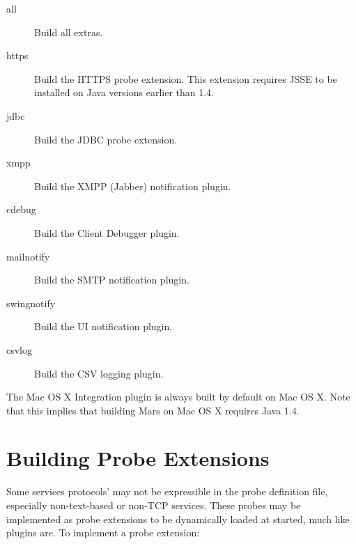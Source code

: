 \documentclass{article}
\begin{document}
\begin{description}
\item[all] Build all extras.
\item[https] Build the HTTPS probe extension. This extension requires
  JSSE to be installed on Java versions earlier than 1.4.
\item[jdbc] Build the JDBC probe extension.
\item[xmpp] Build the XMPP (Jabber) notification plugin.
\item[cdebug] Build the Client Debugger plugin.
\item[mailnotify] Build the SMTP notification plugin.
\item[swingnotify] Build the UI notification plugin.
\item[csvlog] Build the CSV logging plugin.
\end{description}

The Mac OS X Integration plugin is always built by default on Mac OS
X. Note that this implies that building Mars on Mac OS X requires Java
1.4.

\section{Building Probe Extensions}

Some services protocols' may not be expressible in the probe definition file,
especially non-text-based or non-TCP services. These probes may be implemented
as probe extensions to be dynamically loaded at started, much like plugins are.
To implement a probe extension:
\end{document}
